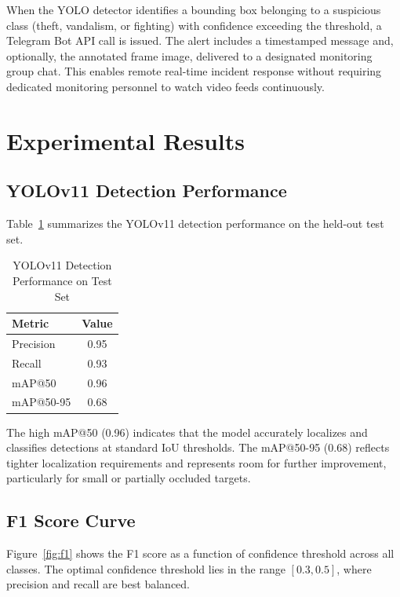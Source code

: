 \documentclass[runningheads]{llncs}
\begin{document}
When the YOLO detector identifies a bounding box belonging to a suspicious class (theft, vandalism, or fighting) with confidence exceeding the threshold, a Telegram Bot API call is issued. The alert includes a timestamped message and, optionally, the annotated frame image, delivered to a designated monitoring group chat. This enables remote real-time incident response without requiring dedicated monitoring personnel to watch video feeds continuously.

\section{Experimental Results}
\label{sec:results}

\subsection{YOLOv11 Detection Performance}

Table~\ref{tab:metrics} summarizes the YOLOv11 detection performance on the held-out test set.

\begin{table}[t]
\caption{YOLOv11 Detection Performance on Test Set}
\label{tab:metrics}
\centering
\begin{tabular}{lc}
\toprule
\textbf{Metric} & \textbf{Value} \\
\midrule
Precision       & 0.95 \\
Recall          & 0.93 \\
mAP@50          & 0.96 \\
mAP@50-95       & 0.68 \\
\bottomrule
\end{tabular}
\end{table}

The high mAP@50 (0.96) indicates that the model accurately localizes and classifies detections at standard IoU thresholds. The mAP@50-95 (0.68) reflects tighter localization requirements and represents room for further improvement, particularly for small or partially occluded targets.

\subsection{F1 Score Curve}

Figure~\ref{fig:f1} shows the F1 score as a function of confidence threshold across all classes. The optimal confidence threshold lies in the range $[0.3, 0.5]$, where precision and recall are best balanced.
\end{document}
